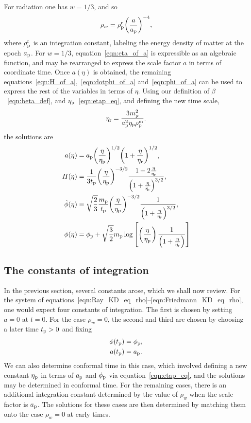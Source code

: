 For radiation one has $w=1/3$, and so
%
\begin{equation}
  \rho_w = \rho_{\mathrm{p}}^{\mathrm{r}}{\left(\frac{a}{a_{\mathrm{p}}}\right)}^{-4},
\end{equation}
%
where $\rho_{\mathrm{p}}^{\mathrm{r}}$ is an integration constant, labeling the energy density of matter at the epoch $a_{\mathrm{p}}$.  For $w=1/3$, equation~\eqref{eqn:eta_of_a} is expressible as an algebraic function, and may be rearranged to express the scale factor $a$ in terms of coordinate time. Once $a(\eta)$ is obtained, the remaining equations~\eqref{eqn:H_of_a},~\eqref{eqn:dotphi_of_a} and~\eqref{eqn:phi_of_a} can be used to express the rest of the variables in terms of $\eta$. Using our definition of $\beta$~\ref{eqn:beta_def}, and $\eta_{\mathrm{p}}$~\ref{eqn:etap_eq}, and defining the new time scale,
%
\begin{equation}
  \eta_{\mathrm{r}} = \frac{3m_{\mathrm{p}}^2}{a_{\mathrm{p}}^2\eta_{\mathrm{p}}\rho_{\mathrm{p}}^{\mathrm{m}}}.
  \label{eqn:etar}
\end{equation}
%
the solutions are
%
\begin{align}
  a(\eta)
  &=
  a_{\mathrm{p}}{\left(\frac{\eta}{\eta_{\mathrm{p}}}\right)}^{1/2}
  {\left({1+\frac{\eta}{\eta_{\mathrm{r}}}}\right)}^{1/2},
  \\
  H(\eta) 
  &= 
  \frac{1}{3t_{\mathrm{p}}}{\left(\frac{\eta}{\eta_{\mathrm{p}}}\right)}^{-3/2}
  \frac{1+ 2\frac{\eta}{\eta_{\mathrm{r}}}}
  {{\left(1+ \frac{\eta}{\eta_{\mathrm{r}}}\right)}^{3/2}},
  \\
  \dot{\phi}(\eta) 
  &=
  \sqrt{\frac{2}{3}}\frac{m_{\mathrm{p}}}{t_{\mathrm{p}}}
  {\left(\frac{\eta}{\eta_{\mathrm{p}}}\right)}^{-3/2}
  \frac{1}{{\left(1+ \frac{\eta}{\eta_{\mathrm{r}}}\right)}^{3/2}},
  \\ 
  \phi(\eta) 
  &=
  \phi_{\mathrm{p}}+\sqrt {\frac{3}{2}}m_{\mathrm{p}}\log  
  \left[
  \left(\frac{\eta}{\eta_{\mathrm{p}}}\right)
  \frac {1}{\left(1+ \frac{\eta}{\eta_{\mathrm{r}}}\right)} 
  \right] 
\end{align}
%

\subsection{The constants of integration}
\label{sec:constants}
In the previous section, several constants arose, which we shall now review. For the system of equations~\eqref{eqn:Ray_KD_eq_rho}--\eqref{eqn:Friedmann_KD_eq_rho}, one would expect four constants of integration. The first is chosen by setting $a=0$ at $t=0$. For the case $\rho_w=0$, the second and third are chosen by choosing a later time $t_{\mathrm{p}}>0$ and fixing
%
\begin{align}
  \phi(t_{\mathrm{p}}) &= \phi_{\mathrm{p}}, \nonumber\\
  a(t_{\mathrm{p}}) &= a_{\mathrm{p}}. \nonumber
\end{align}
%
We can also determine conformal time in this case, which involved defining a new constant $\eta_{\mathrm{p}}$ in terms of $a_{\mathrm{p}}$ and $\phi_{\mathrm{p}}$ via equation~\eqref{eqn:etap_eq}, and the solutions may be determined in conformal time. For the remaining cases, there is an additional integration constant determined by the value of $\rho_w$ when the scale factor is $a_{\mathrm{p}}$. The solutions for these cases are then determined by matching them onto the case $\rho_w=0$ at early times.

